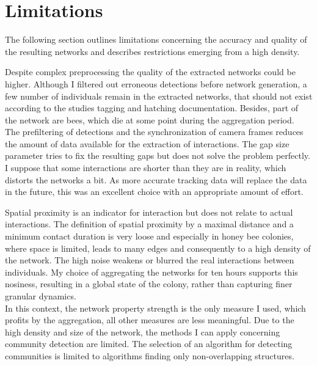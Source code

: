 \section{Limitations}
The following section outlines limitations concerning the accuracy and quality of the resulting networks and describes restrictions emerging from a high density.

Despite complex preprocessing the quality of the extracted networks could be higher. Although I filtered out erroneous detections before network generation, a few number of individuals remain in the extracted networks, that should not exist according to the studies tagging and hatching documentation. Besides, part of the network are bees, which die at some point during the aggregation period.\\
The prefiltering of detections and the synchronization of camera frames reduces the amount of data available for the extraction of interactions. The gap size parameter tries to fix the resulting gaps but does not solve the problem perfectly. I suppose that some interactions are shorter than they are in reality, which distorts the networks a bit. As more accurate tracking data will replace the data in the future, this was an excellent choice with an appropriate amount of effort.

Spatial proximity is an indicator for interaction but does not relate to actual interactions. The definition of spatial proximity by a maximal distance and a minimum contact duration is very loose and especially in honey bee colonies, where space is limited, leads to many edges and consequently to a high density of the network. The high noise weakens or blurred the real interactions between individuals.
My choice of aggregating the networks for ten hours supports this nosiness, resulting in a global state of the colony, rather than capturing finer granular dynamics.\\
In this context, the network property strength is the only measure I used, which profits by the aggregation, all other measures are less meaningful.
Due to the high density and size of the network, the methods I can apply concerning community detection are limited.
The selection of an algorithm for detecting communities is limited to algorithms finding only non-overlapping structures.

